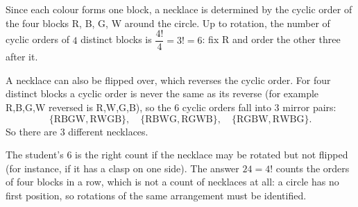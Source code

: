 Since each colour forms one block, a necklace is determined by the cyclic order of the four blocks R, B, G, W around the circle. Up to rotation, the number of cyclic orders of $4$ distinct blocks is $\dfrac{4!}{4}=3!=6$: fix R and order the other three after it.

A necklace can also be flipped over, which reverses the cyclic order. For four distinct blocks a cyclic order is never the same as its reverse (for example R,B,G,W reversed is R,W,G,B), so the $6$ cyclic orders fall into $3$ mirror pairs:
\[
\{\text{RBGW},\text{RWGB}\},\quad\{\text{RBWG},\text{RGWB}\},\quad\{\text{RGBW},\text{RWBG}\}.
\]
So there are $\boxed{3}$ different necklaces.

The student's $6$ is the right count if the necklace may be rotated but not flipped (for instance, if it has a clasp on one side). The answer $24=4!$ counts the orders of four blocks in a row, which is not a count of necklaces at all: a circle has no first position, so rotations of the same arrangement must be identified.
